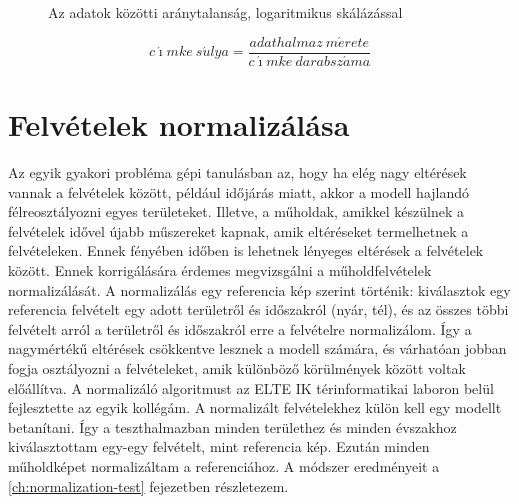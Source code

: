 \begin{figure}
    \caption{Az adatok közötti aránytalanság, logaritmikus skálázással}
    \label{fig:unbalanced-data}
\end{figure}

\begin{equation}\label{eq:weights}
    c\acute{\imath}mke \ s\acute{u}lya=\frac{adathalmaz \ m\acute{e}rete}{c\acute{\imath}mke \ darabsz\acute{a}ma}
\end{equation}

\section{Felvételek normalizálása}

Az egyik gyakori probléma gépi tanulásban az, hogy ha elég nagy eltérések vannak a felvételek között, például időjárás miatt, akkor a modell hajlandó félreosztályozni egyes területeket. Illetve, a műholdak, amikkel készülnek a felvételek idővel újabb műszereket kapnak, amik eltéréseket termelhetnek a felvételeken. Ennek fényében időben is lehetnek lényeges eltérések a felvételek között. Ennek korrigálására érdemes megvizsgálni a műholdfelvételek normalizálását. A normalizálás egy referencia kép szerint történik: kiválasztok egy referencia felvételt egy adott területről és időszakról (nyár, tél), és az összes többi felvételt arról a területről és időszakról erre a felvételre normalizálom. Így a nagymértékű eltérések csökkentve lesznek a modell számára, és várhatóan jobban fogja osztályozni a felvételeket, amik különböző körülmények között voltak előállítva. A normalizáló algoritmust az ELTE IK térinformatikai laboron belül fejlesztette az egyik kollégám.
A normalizált felvételekhez külön kell egy modellt betanítani. Így a teszthalmazban minden területhez és minden évszakhoz kiválasztottam egy-egy felvételt, mint referencia kép. Ezután minden műholdképet normalizáltam a referenciához. A módszer eredményeit a \ref{ch:normalization-test} fejezetben részletezem.

